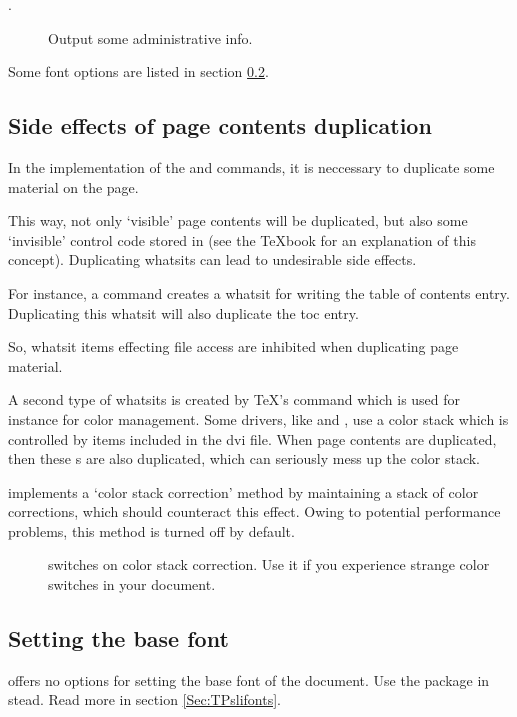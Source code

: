 \begin{slide}
\begin{description}
\item[.] Output some administrative info.
\end{description}
Some font options are listed in section \ref{Sec:BaseFont}.

\newslide

\subsection{Side effects of page contents duplication}\label{Sec:Dupl}
In the implementation of the  and  commands, it is neccessary to duplicate some
material on the page.

This way, not only `visible' page contents will be duplicated, but also some `invisible' control code stored in
 (see the \TeX book for an explanation of this concept). Duplicating whatsits can lead to undesirable
side effects.

For instance, a  command creates a whatsit for writing the table of contents entry. Duplicating this
whatsit will also duplicate the toc entry.

\newslide

So, whatsit items effecting file access are inhibited when duplicating page material.

A second type of whatsits is created by \TeX's  command which is used for instance for color
management. Some drivers, like  and , use a color stack which is controlled by
 items included in the dvi file. When page contents are duplicated, then these s
are also duplicated, which can seriously mess up the color stack.

\newslide

 implements a `color stack correction' method by maintaining a stack of color corrections, which should
counteract this effect. Owing to potential performance problems, this method is turned off by default.
\begin{description}
\item[] switches on color stack correction. Use it if you experience strange color
  switches in your document.
\end{description}

\newslide

\subsection{Setting the base font}\label{Sec:BaseFont}
 offers no options for setting the base font of the document.
Use the  package in stead. Read more in section \ref{Sec:TPslifonts}.


\end{slide}
